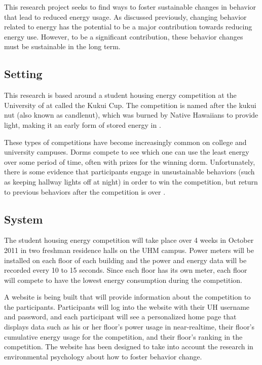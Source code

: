 This research project seeks to find ways to foster sustainable changes in behavior that lead to reduced energy usage. As discussed previously, changing behavior related to energy has the potential to be a major contribution towards reducing energy use. However, to be a significant contribution, these behavior changes must be sustainable in the long term.

\subsection{Setting}
This research is based around a student housing energy competition at the University of \Hawaii at \Manoa called the Kukui Cup. The competition is named after the kukui nut (also known as candlenut), which was burned by Native Hawaiians to provide light, making it an early form of stored energy in \Hawaii.

These types of competitions have become increasingly common on college and university campuses. Dorms compete to see which one can use the least energy over some period of time, often with prizes for the winning dorm. Unfortunately, there is some evidence that participants engage in unsustainable behaviors (such as keeping hallway lights off at night) in order to win the competition, but return to previous behaviors after the competition is over \cite{petersen-dorm-energy-reduction}.

\subsection{System}
The student housing energy competition will take place over 4 weeks in October 2011 in two freshman residence halls on the UHM campus. Power meters will be installed on each floor of each building and the power and energy data will be recorded every 10 to 15 seconds. Since each floor has its own meter, each floor will compete to have the lowest energy consumption during the competition.

A website is being built that will provide information about the competition to the participants. Participants will log into the website with their UH username and password, and each participant will see a personalized home page that displays data such as his or her floor's power usage in near-realtime, their floor's cumulative energy usage for the competition, and their floor's ranking in the competition. The website has been designed to take into account the research in environmental psychology about how to foster behavior change.

